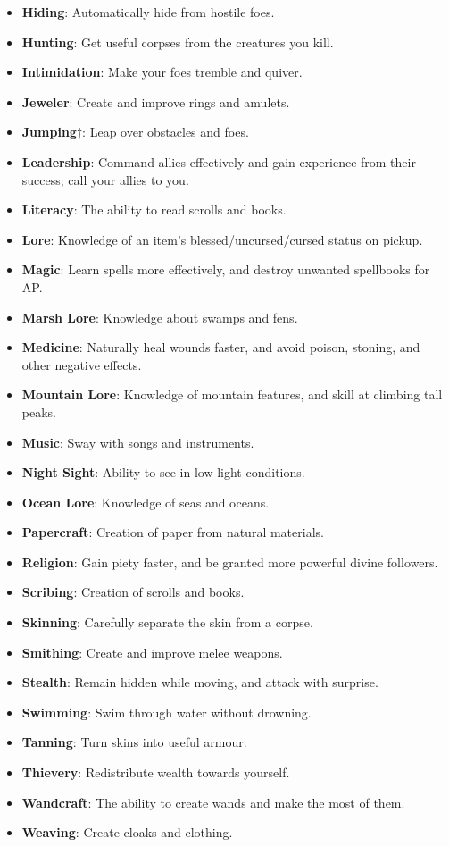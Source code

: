 \begin{itemize}
\item {\bf Hiding}: Automatically hide from hostile foes.
\item {\bf Hunting}: Get useful corpses from the creatures you kill. 
\item {\bf Intimidation}: Make your foes tremble and quiver. 
\item {\bf Jeweler}: Create and improve rings and amulets. 
\item {\bf Jumping}$\dagger$: Leap over obstacles and foes.
\item {\bf Leadership}: Command allies effectively and gain experience from their success; call your allies to you. 
\item {\bf Literacy}: The ability to read scrolls and books.
\item {\bf Lore}: Knowledge of an item's blessed/uncursed/cursed status on pickup.
\item {\bf Magic}: Learn spells more effectively, and destroy unwanted spellbooks for AP.
\item {\bf Marsh Lore}: Knowledge about swamps and fens. 
\item {\bf Medicine}: Naturally heal wounds faster, and avoid poison, stoning, and other negative effects.
\item {\bf Mountain Lore}: Knowledge of mountain features, and skill at climbing tall peaks.
\item {\bf Music}: Sway with songs and instruments. 
\item {\bf Night Sight}: Ability to see in low-light conditions. 
\item {\bf Ocean Lore}: Knowledge of seas and oceans. 
\item {\bf Papercraft}: Creation of paper from natural materials. 
\item {\bf Religion}: Gain piety faster, and be granted more powerful divine followers. 
\item {\bf Scribing}: Creation of scrolls and books. 
\item {\bf Skinning}: Carefully separate the skin from a corpse. 
\item {\bf Smithing}: Create and improve melee weapons.
\item {\bf Stealth}: Remain hidden while moving, and attack with surprise.
\item {\bf Swimming}: Swim through water without drowning.
\item {\bf Tanning}: Turn skins into useful armour.
\item {\bf Thievery}: Redistribute wealth towards yourself.
\item {\bf Wandcraft}: The ability to create wands and make the most of them.
\item {\bf Weaving}: Create cloaks and clothing.
\end{itemize}

